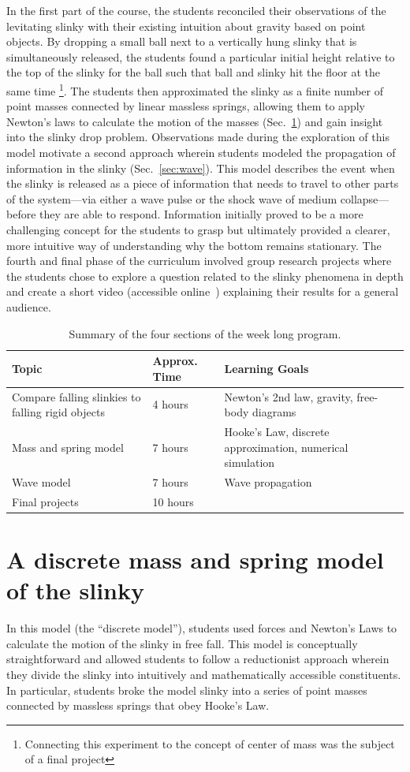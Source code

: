 \documentclass[pre,preprint,superscriptaddress,longbibliography]{revtex4-1}
\renewcommand{\sec}[1]{section~\ref{sec:#1}}
\newcommand{\fig}[1]{figure~\ref{fig:#1}}
\newcommand{\TABcurriculum}{
\begin{table}[h]\centering
\begin{tabular}{p{5cm}lp{5cm}}
\textbf{Topic} & \textbf{Approx. Time} & \textbf{Learning Goals}\\
\hline
Compare falling slinkies to falling rigid objects & 4 hours & Newton's 2nd law, gravity, free-body diagrams\\
Mass and spring model & 7 hours & Hooke's Law, discrete approximation, numerical simulation\\
Wave model &  7 hours & Wave propagation \\
Final projects & 10 hours &

\end{tabular}
\caption{\label{tab:curriculum} Summary of the four sections of the week long program.}
\end{table}
}
\begin{document}
In the first part of the course, the students reconciled their observations of the levitating slinky with their existing intuition about gravity based on point objects.  By dropping a small ball next to a vertically hung slinky that is simultaneously released, the students found a particular initial height relative to the top of the slinky for the ball such that ball and slinky hit the floor at the same time \footnote{Connecting this experiment to the concept of center of mass was the subject of a final project}.
The students then approximated the slinky as a finite number of point masses connected by linear massless springs, allowing them to apply  Newton's laws to calculate the motion of the masses  (Sec.~\ref{sec:discrete})  and gain insight into the slinky drop problem.  
Observations made during the exploration of this model motivate a second approach wherein students modeled the propagation of information in the slinky (Sec.~\ref{sec:wave}). This model describes the event when the slinky is released as a piece of information that needs to travel to other parts of the system---via either a wave pulse or the shock wave of medium collapse---before they are able to respond.  Information initially proved to be a more challenging concept for the students to grasp but ultimately provided a clearer, more intuitive way of understanding why the bottom remains stationary.  %
The fourth and final phase of the curriculum involved group research projects where the students chose to explore a question related to the slinky phenomena in depth and create a short video  (accessible online~\cite{compassyoutube}) explaining their results for a general audience. 

\TABcurriculum


\section{A discrete mass and spring  model of the slinky}
\label{sec:discrete}
In this model (the ``discrete model''), students used forces and Newton's Laws to calculate the
motion of the slinky in free fall. This
model is conceptually straightforward and allowed students to follow a
reductionist approach wherein they divide the slinky into intuitively and mathematically accessible
constituents. In particular, students broke the model slinky into a series of point masses connected by massless springs that obey Hooke's Law.%
\end{document}
